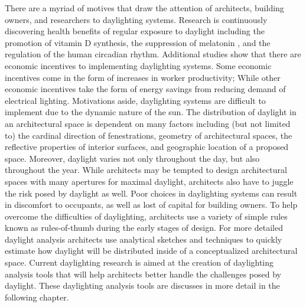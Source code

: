 There are a myriad of motives that draw the attention of architects, building owners, and researchers to daylighting systems.
Research is continuously discovering health benefits of regular exposure to daylight including the promotion of vitamin D synthesis, the suppression of melatonin , and the regulation of the human circadian rhythm.
Additional studies show  that there are economic incentives to implementing daylighting systems.
Some economic incentives come in the form of increases in worker productivity; 
While other economic incentives take the form of energy savings from reducing demand of electrical lighting.
Motivations aside, daylighting systems are difficult to implement due to the dynamic nature of the sun.
The distribution of daylight in an architectural space is dependent on many factors including (but not limited to) the cardinal direction of fenestrations, geometry of architectural spaces, the reflective properties of interior surfaces, and geographic location of a proposed space.
Moreover, daylight varies not only throughout the day, but also throughout the year.
While architects may be tempted to design architectural spaces with many apertures for maximal daylight, architects also have to juggle the risk posed by daylight as well.
Poor choices in daylighting systems can result in discomfort to occupants, as well as lost of capital for building owners.
To help overcome the difficulties of daylighting, architects use a variety of simple rules known as rules-of-thumb during the early stages of design.
For more detailed daylight analysis architects use analytical sketches and techniques to quickly estimate how daylight will be distributed inside of a conceptualized architectural space. 
Current daylighting research is aimed at the creation of daylighting analysis tools that will help architects better handle the challenges posed by daylight.
These daylighting analysis tools are discusses in more detail in the following chapter.
